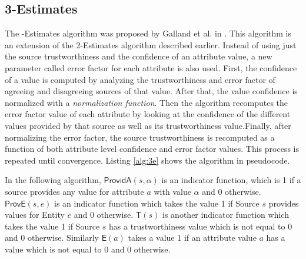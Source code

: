 \documentclass{acm_proc_article-sp}
\begin{document}
\subsection{3-Estimates}
The {-Estimates} algorithm was proposed by Galland et al. in \cite{galland:corro}. This algorithm is an extension of the 2-Estimates algorithm described earlier. Instead of using just the source trustworthiness and the confidence of an attribute value, a new parameter called error factor for each attribute is also used. First, the confidence of a value is computed by analyzing the trustworthiness and error factor of agreeing and disagreeing sources of that value. After that, the value confidence is normalized with a \emph{normalization function}. Then the algorithm recomputes the error factor value of each attribute by looking at the confidence of the different values provided by that source as well as its trustworthiness value.Finally, after normalizing the error factor,  the source trustworthiness is recomputed as a function of both attribute level confidence and error factor values. This process is repeated until convergence. Listing \ref{alg:3e} shows the algorithm in pseudocode.

In the following algorithm, $\mathsf{ProvidA}(s,\alpha)$ is an indicator function, which is 1 if a source provides any value for attribute $a$ with value $\alpha$ and 0 otherwise. $\mathsf{ProvE}(s,e)$ is an indicator function which takes the value 1 if Source $s$ provides values for Entity $e$ and 0 otherwise. $\mathsf{T}(s)$ is another indicator function which takes the value 1 if Source $s$ has a trustworthiness value which is not equal to $0$ and 0 otherwise. Similarly $\mathsf{E}(a)$  takes a value 1 if an attribute value $a$ has a value which is not equal to 0 and 0 otherwise.
\end{document}

